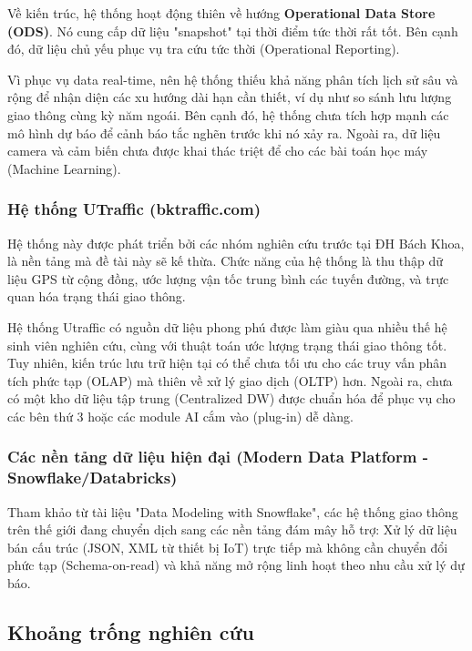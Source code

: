Về kiến trúc, hệ thống hoạt động thiên về hướng \textbf{Operational Data Store (ODS)}. Nó cung cấp dữ liệu "snapshot" tại thời điểm tức thời rất tốt. Bên cạnh đó, dữ liệu chủ yếu phục vụ tra cứu tức thời (Operational Reporting).

Vì phục vụ data real-time, nên hệ thống thiếu khả năng phân tích lịch sử sâu và rộng để nhận diện các xu hướng dài hạn cần thiết, ví dụ như so sánh lưu lượng giao thông cùng kỳ năm ngoái. Bên cạnh đó, hệ thống chưa tích hợp mạnh các mô hình dự báo để cảnh báo tắc nghẽn trước khi nó xảy ra. Ngoài ra, dữ liệu camera và cảm biến chưa được khai thác triệt để cho các bài toán học máy (Machine Learning).

\subsubsection{Hệ thống UTraffic (bktraffic.com)}

Hệ thống này được phát triển bởi các nhóm nghiên cứu trước tại ĐH Bách Khoa, là nền tảng mà đề tài này sẽ kế thừa. Chức năng của hệ thống là thu thập dữ liệu GPS từ cộng đồng, ước lượng vận tốc trung bình các tuyến đường, và trực quan hóa trạng thái giao thông.

Hệ thống Utraffic có nguồn dữ liệu phong phú được làm giàu qua nhiều thế hệ sinh viên nghiên cứu, cùng với thuật toán ước lượng trạng thái giao thông tốt. Tuy nhiên, kiến trúc lưu trữ hiện tại có thể chưa tối ưu cho các truy vấn phân tích phức tạp (OLAP) mà thiên về xử lý giao dịch (OLTP) hơn. Ngoài ra, chưa có một kho dữ liệu tập trung (Centralized DW) được chuẩn hóa để phục vụ cho các bên thứ 3 hoặc các module AI cắm vào (plug-in) dễ dàng.

\subsubsection{Các nền tảng dữ liệu hiện đại (Modern Data Platform - Snowflake/Databricks)}

Tham khảo từ tài liệu "Data Modeling with Snowflake", các hệ thống giao thông trên thế giới đang chuyển dịch sang các nền tảng đám mây hỗ trợ: Xử lý dữ liệu bán cấu trúc (JSON, XML từ thiết bị IoT) trực tiếp mà không cần chuyển đổi phức tạp (Schema-on-read) và khả năng mở rộng linh hoạt theo nhu cầu xử lý dự báo.

\subsection{Khoảng trống nghiên cứu}

